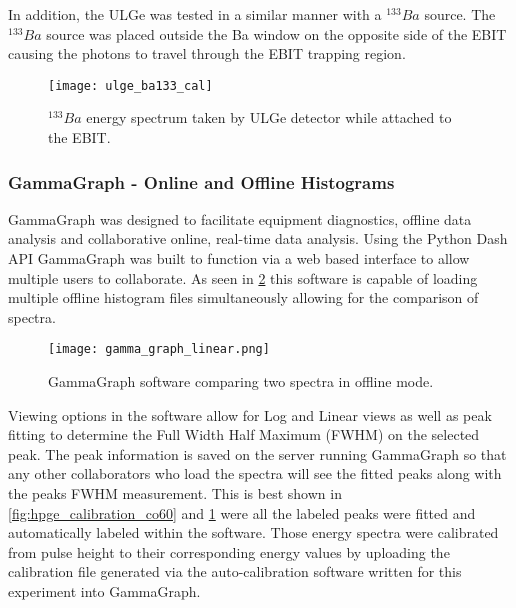 \documentclass[jon_ringuette_thesis_proposal.tex]{subfiles}
\begin{document}
    In addition, the ULGe was tested in a similar manner with a $^{133}Ba$ source.
    The $^{133}Ba$ source was placed outside the Ba window on the opposite side of the EBIT causing the photons to travel through the EBIT trapping region.
    \begin{figure}[H]
        \begin{center}
            \begin{mdframed}[backgroundcolor=black!80]
                \texttt{[image: ulge\_ba133\_cal]}
            \end{mdframed}
        \end{center}
        \caption{$^{133}Ba$ energy spectrum taken by ULGe detector while attached to the EBIT.}
        \label{fig:ulge_calibration_ba133}
    \end{figure}

    \subsubsection{GammaGraph - Online and Offline Histograms}

    GammaGraph was designed to facilitate equipment diagnostics, offline data analysis and collaborative online, real-time data analysis.
    Using the Python Dash API GammaGraph was built to function via a web based interface to allow multiple users to collaborate.
    As seen in \ref{fig:gammagraph_linear} this software is capable of loading multiple offline histogram files simultaneously allowing for the comparison of spectra.

    \begin{figure}[H]
      \begin{center}
        \texttt{[image: gamma\_graph\_linear.png]}
      \end{center}
      \caption{GammaGraph software comparing two spectra in offline mode.}
      \label{fig:gammagraph_linear}
    \end{figure}

    Viewing options in the software allow for Log and Linear views as well as peak fitting to determine the Full Width Half Maximum  (FWHM) on the selected peak.
    The peak information is saved on the server running GammaGraph so that any other collaborators who load the spectra will see the fitted peaks along with the peaks FWHM measurement.
    This is best shown in \ref{fig:hpge_calibration_co60} and \ref{fig:ulge_calibration_ba133} were all the labeled peaks were fitted and automatically labeled within the software.
    Those energy spectra were calibrated from pulse height to their corresponding energy values by uploading the calibration file generated via the auto-calibration software written for this experiment into GammaGraph.
\end{document}
